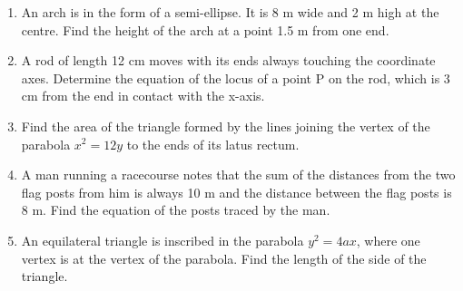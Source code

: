 \begin{enumerate}[label=\arabic*.,ref=\thesubsection.\theenumi]
\item An arch is in the form of a semi-ellipse. It is 8 m wide and 2 m high at the centre. Find the height of the arch at a point 1.5 m from one end.
\item A rod of length 12 cm moves with its ends always touching the coordinate axes. Determine the equation of the locus of a point P on the rod, which is 3 cm from the end in contact with the x-axis.
\item Find the area of the triangle formed by the lines joining the vertex of the parabola $x^2= 12y$ to the ends of its latus rectum.
\item A man running a racecourse notes that the sum of the distances from the two flag posts from him is always 10 m and the distance between the flag posts is 8 m. Find the equation of the posts traced by the man.
\item An equilateral triangle is inscribed in the parabola $y^2 = 4 ax$, where one vertex is at the vertex of the parabola. Find the length of the side of the triangle.
\end{enumerate}
